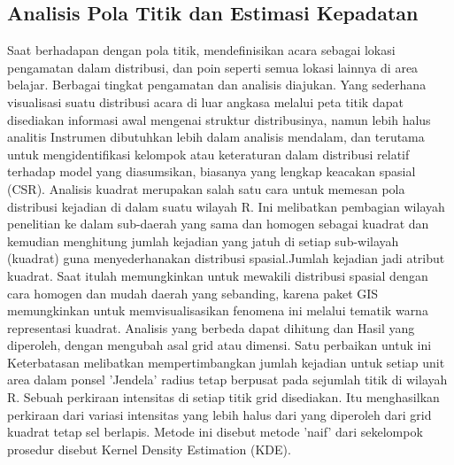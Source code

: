 \subsection{Analisis Pola Titik dan Estimasi Kepadatan}
Saat berhadapan dengan pola titik, mendefinisikan acara sebagai lokasi pengamatan dalam distribusi, dan poin seperti semua lokasi lainnya di area belajar. Berbagai tingkat pengamatan dan analisis diajukan. Yang sederhana visualisasi suatu distribusi acara di luar angkasa melalui peta titik dapat disediakan informasi awal mengenai struktur distribusinya, namun lebih halus analitis Instrumen dibutuhkan lebih dalam analisis mendalam, dan terutama untuk mengidentifikasi kelompok atau keteraturan dalam distribusi relatif terhadap model yang diasumsikan, biasanya yang lengkap keacakan spasial (CSR).
Analisis kuadrat merupakan salah satu cara untuk memesan pola distribusi kejadian di dalam suatu wilayah R. Ini melibatkan pembagian wilayah penelitian ke dalam sub-daerah yang sama dan homogen sebagai kuadrat dan kemudian menghitung jumlah kejadian yang jatuh di setiap sub-wilayah (kuadrat) guna menyederhanakan distribusi spasial.Jumlah kejadian jadi atribut kuadrat. Saat itulah memungkinkan untuk mewakili distribusi spasial dengan cara homogen dan mudah daerah yang sebanding, karena paket GIS memungkinkan untuk memvisualisasikan fenomena ini melalui tematik warna representasi kuadrat.
Analisis yang berbeda dapat dihitung dan Hasil yang diperoleh, dengan mengubah asal grid atau dimensi. Satu perbaikan untuk ini Keterbatasan melibatkan mempertimbangkan jumlah kejadian untuk setiap unit area dalam ponsel 'Jendela' radius tetap berpusat pada sejumlah titik di wilayah R. Sebuah perkiraan intensitas di setiap titik grid disediakan. Itu menghasilkan perkiraan dari variasi intensitas yang lebih halus dari yang diperoleh dari grid kuadrat tetap sel berlapis. Metode ini disebut metode 'naif' dari sekelompok prosedur disebut Kernel Density Estimation (KDE).
